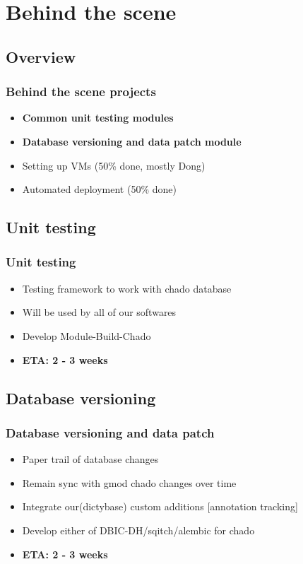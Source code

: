 \documentclass[hyperref={pdfpagelabels=false}, compress]{beamer}
\begin{document}
\section{Behind the scene}
\subsection{Overview}
\begin{frame}
  \frametitle{Behind the scene projects}
  \begin{itemize}
       \item  \textbf{Common unit testing modules}
        \item \textbf{Database versioning and data patch module}
         \item Setting up VMs (50\% done, mostly Dong)
         \item Automated deployment (50\% done)
  \end{itemize}
\end{frame}

\subsection{Unit testing}
\begin{frame}
  \frametitle{Unit testing}
  \begin{itemize}
      \item Testing framework to work with chado database
      \item Will be used by all of our softwares
      \item Develop Module-Build-Chado
      \item \textbf{ETA: 2 - 3 weeks}
  \end{itemize}
\end{frame}

\subsection{Database versioning}
\begin{frame}
  \frametitle{Database versioning and data patch}
  \begin{itemize}
      \item Paper trail of database changes
      \item Remain sync with gmod chado changes over time
      \item Integrate our(dictybase) custom additions [annotation tracking]
      \item Develop either of DBIC-DH/sqitch/alembic for chado
      \item \textbf{ETA: 2 - 3 weeks}
  \end{itemize}
\end{frame}
\end{document}
